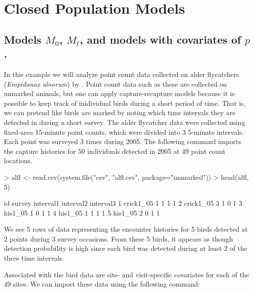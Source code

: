 \documentclass[a4paper]{article}
\renewenvironment{Schunk}{\vspace{\topsep}}{\vspace{\topsep}}
\begin{document}
\section{Closed Population Models}




\subsection{Models $M_0$, $M_t$, and models with covariates of $p$.}


In this example we will analyze point count data collected on alder
flycatchers (\emph{Empidonax alnorum}) by
\citet{chandler_etal:2009}. Point count data such as these are
collected on unmarked animals, but one can apply
capture-recapture models because it is possible to keep track of
inidividual birds during a short period of time. That is, we can
pretend like birds are marked by noting which time intervals they are
detected in during a short survey. The alder flycatcher data were
collected using fixed-area 15-minute point counts, which were divided
into 3
5-minute intervals. Each point was surveyed 3 times during 2005.
The following command imports the
capture histories for 50 individuals detected in 2005 at 49 point
count locations.

\newpage

\begin{Schunk}
\begin{Sinput}
> alfl <- read.csv(system.file("csv", "alfl.csv", package="unmarked"))
> head(alfl, 5)
\end{Sinput}
\begin{Soutput}
         id survey interval1 interval2 interval3
1 crick1_05      1         1         1         1
2 crick1_05      3         1         0         1
3   his1_05      1         0         1         1
4   his1_05      1         1         1         1
5   his1_05      2         0         1         1
\end{Soutput}
\end{Schunk}
We see 5 rows of data representing the encounter histories for 5 birds
detected at 2 points during 3 survey occasions. From these 5 birds, it appears as though
detection probability is high since each bird was detected during at
least 2 of the three time intervals.

Associated with the bird data are site- and visit-specific covariates
for each of the 49 sites. We can import these data using the following
command:
\end{document}
